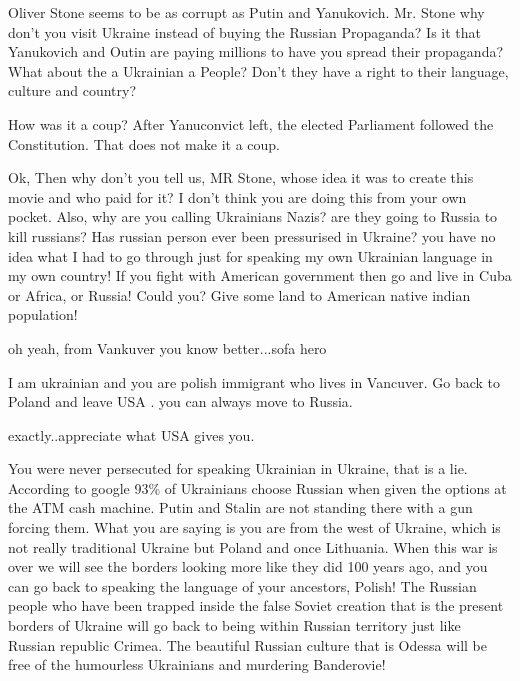\begin{itemize}
\begin{itemize}

Oliver Stone seems to be as corrupt as Putin and Yanukovich. Mr. Stone why
don't you visit Ukraine instead of buying the Russian Propaganda? Is it that
Yanukovich and Outin are paying millions to have you spread their propaganda?
What about the a Ukrainian a People? Don't they have a right to their language,
culture and country?



How was it a coup? After Yanuconvict left, the elected Parliament followed the
Constitution. That does not make it a coup.

\end{itemize} %


Ok, Then why don't you tell us, MR Stone, whose idea it was to create this
movie and who paid for it? I don't think you are doing this from your own
pocket. Also, why are you calling Ukrainians Nazis? are they going to Russia to
kill russians? Has russian person ever been pressurised in Ukraine? you have no
idea what I had to go through just for speaking my own Ukrainian language in my
own country! If you fight with American government then go and live in Cuba or
Africa, or Russia! Could you? Give some land to American native indian
population!

\begin{itemize} %
oh yeah, from Vankuver you know better...sofa hero

I am ukrainian and you are polish immigrant who lives in Vancuver. Go back to Poland and leave USA . you can always move to Russia.

exactly..appreciate what USA gives you.


You were never persecuted for speaking Ukrainian in Ukraine, that is a lie.
According to google 93\% of Ukrainians choose Russian when given the options at
the ATM cash machine. Putin and Stalin are not standing there with a gun
forcing them. What you are saying is you are from the west of Ukraine, which is
not really traditional Ukraine but Poland and once Lithuania. When this war is
over we will see the borders looking more like they did 100 years ago, and you
can go back to speaking the language of your ancestors, Polish! The Russian
people who have been trapped inside the false Soviet creation that is the
present borders of Ukraine will go back to being within Russian territory just
like Russian republic Crimea. The beautiful Russian culture that is Odessa will
be free of the humourless Ukrainians and murdering Banderovie!


\end{itemize}
\end{itemize}
